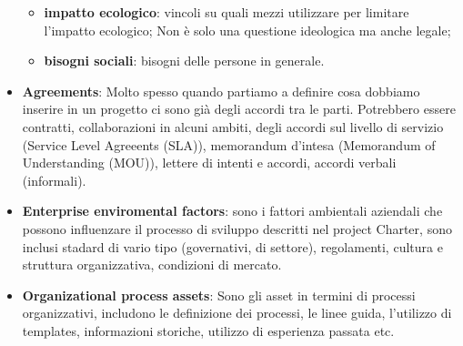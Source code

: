 \begin{itemize}
\begin{itemize}
		\item \textbf{impatto ecologico}: vincoli su quali mezzi utilizzare per limitare l'impatto ecologico; Non è solo una questione ideologica ma anche legale;
		\item \textbf{bisogni sociali}: bisogni delle persone in generale.
	\end{itemize}
	\item \textbf{Agreements}: Molto spesso quando partiamo a definire cosa dobbiamo inserire in un progetto ci sono già degli accordi tra le parti. Potrebbero essere contratti, collaborazioni in alcuni ambiti, degli accordi sul livello di servizio (Service Level Agreeents (SLA)), memorandum d'intesa (Memorandum of Understanding (MOU)), lettere di intenti e accordi, accordi verbali (informali).
	\item \textbf{Enterprise enviromental factors}: sono i fattori ambientali aziendali che possono influenzare il processo di sviluppo descritti nel project Charter, sono inclusi stadard di vario tipo (governativi, di settore), regolamenti, cultura e struttura organizzativa, condizioni di mercato.
	\item \textbf{Organizational process assets}: Sono gli asset in termini di processi organizzativi, includono le definizione dei processi, le linee guida, l'utilizzo di templates, informazioni storiche, utilizzo di esperienza passata etc.
\end{itemize}
